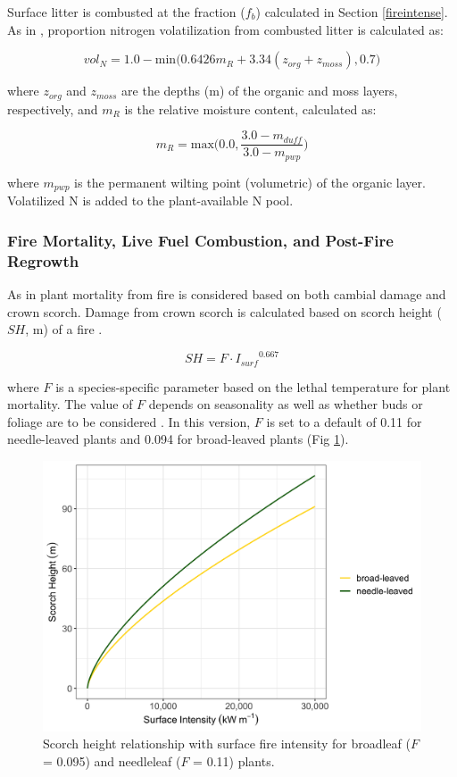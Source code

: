 \documentclass[a4paper, 12pt] {report}
\begin{document}
Surface litter is combusted at the fraction ($f_b$) calculated in Section \ref{fireintense}. As in , proportion nitrogen volatilization from combusted litter is calculated as:

\begin{equation}
	vol_N = 1.0 - \text{min}\Big(0.6426m_R + 3.34(z_{org} + z_{moss}), 0.7\Big)
\end{equation}

where $z_{org}$ and $z_{moss}$ are the depths (m) of the organic and moss layers, respectively, and $m_R$ is the relative moisture content, calculated as:

\begin{equation}
	m_R = \text{max}\Big(0.0, \frac{3.0 - m_{duff}}{3.0 - m_{pwp}}\Big)
\end{equation}

where $m_{pwp}$ is the permanent wilting point (volumetric) of the organic layer. Volatilized N is added to the plant-available N pool. 

\subsubsection{Fire Mortality, Live Fuel Combustion, and Post-Fire Regrowth}

As in  plant mortality from fire is considered based on both cambial damage and crown scorch. Damage from crown scorch is calculated based on scorch height ($SH$, m) of a fire \cite{petersonModelingPostfireConifer1986}.

\begin{equation}
	SH = F \cdot { I_{surf}}^{0.667}
\end{equation}

where $F$ is a species-specific parameter based on the lethal temperature for plant mortality. The value of $F$ depends on seasonality as well as whether buds or foliage are to be considered \cite{johnsonFireVegetationDynamics1992}. In this version, $F$ is set to a default of 0.11 for needle-leaved plants and 0.094 for broad-leaved plants \cite{thonickeInfluenceVegetationFire2010} (Fig \ref{fig:scorch}).

\begin{figure} 
	\includegraphics[width=0.75\linewidth]{figures/ScorchHeight.png}
	\caption{Scorch height relationship with surface fire intensity for broadleaf ($F$ = 0.095) and needleleaf ($F$ = 0.11) plants.}
	\label{fig:scorch}
\end{figure}
\end{document}
